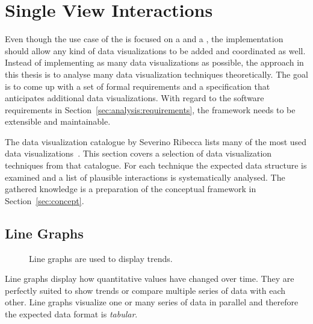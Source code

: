 \section{Single View Interactions}\label{sec:analysis:examples:single}

Even though the use case of the \cmv{} is focused on a \tmap{} and a \gv{}, the implementation should allow any kind of data visualizations to be added and coordinated as well.
Instead of implementing as many data visualizations as possible, the approach in this thesis is to analyse many data visualization techniques theoretically.
The goal is to come up with a set of formal requirements and a specification that anticipates additional data visualizations.
With regard to the software requirements in Section~\ref{sec:analysis:requirements}, the \cmv{} framework needs to be extensible and maintainable.

The data visualization catalogue by Severino Ribecca lists many of the most used data visualizations~\parencite{VisualizationCatalogue2017}.
This section covers a selection of data visualization techniques from that catalogue.
For each technique the expected data structure is examined and a list of plausible interactions is systematically analysed.
The gathered knowledge is a preparation of the conceptual framework in Section~\ref{sec:concept}.

\subsection{Line Graphs}
\begin{figure}
  \begin{center}
    \qquad
  \caption{Line graphs are used to display trends.}
  \label{fig:analysis:line-graphs}
  \end{center}
\end{figure}

Line graphs display how quantitative values have changed over time.
They are perfectly suited to show trends or compare multiple series of data with each other.
Line graphs visualize one or many series of data in parallel and therefore the expected data format is \emph{tabular}.

